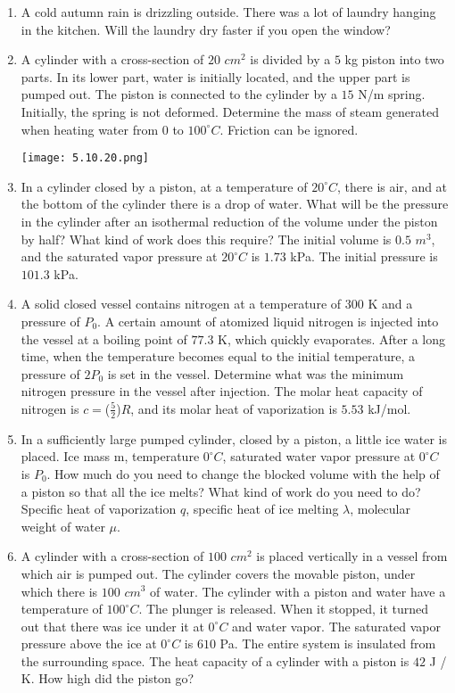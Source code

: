 \documentclass{article}
\begin{document}
\begin{enumerate}[label=5.10.\arabic*]
\item A cold autumn rain is drizzling outside. There was a lot of laundry hanging in the kitchen. Will the laundry dry faster if you open the window?

\item A cylinder with a cross-section of $20$ $cm^2$ is divided by a $5$ kg piston into two parts. In its lower part, water is initially located, and the upper part is pumped out. The piston is connected to the cylinder by a $15$ N/m spring. Initially, the spring is not deformed. Determine the mass of steam generated when heating water from $0$ to $100^\circ C$. Friction can be ignored.

\begin{center}
    \texttt{[image: 5.10.20.png]}
\end{center}

\item In a cylinder closed by a piston, at a temperature of $20^\circ C$, there is air, and at the bottom of the cylinder there is a drop of water. What will be the pressure in the cylinder after an isothermal reduction of the volume under the piston by half? What kind of work does this require? The initial volume is $0.5$ $m^3$, and the saturated vapor pressure at $20^\circ C$ is $1.73$ kPa. The initial pressure is $101.3$ kPa.

\item A solid closed vessel contains nitrogen at a temperature of $300$ K and a pressure of $P_0$. A certain amount of atomized liquid nitrogen is injected into the vessel at a boiling point of $77.3$ K, which quickly evaporates. After a long time, when the temperature becomes equal to the initial temperature, a pressure of $2P_0$ is set in the vessel. Determine what was the minimum nitrogen pressure in the vessel after injection. The molar heat capacity of nitrogen is $c = $($\frac{5}{2}$)$R$, and its molar heat of vaporization is $5.53$ kJ/mol.

\item In a sufficiently large pumped cylinder, closed by a piston, a little ice water is placed. Ice mass m, temperature $0^\circ C$, saturated water vapor pressure at $0^\circ C$ is $P_0$. How much do you need to change the blocked volume with the help of a piston so that all the ice melts? What kind of work do you need to do? Specific heat of vaporization $q$, specific heat of ice melting $\lambda$, molecular weight of water $\mu$.

\item A cylinder with a cross-section of $100$ $cm^2$ is placed vertically in a vessel from which air is pumped out. The cylinder covers the movable piston, under which there is $100$ $cm^3$ of water. The cylinder with a piston and water have a temperature of $100^\circ C$. The plunger is released. When it stopped, it turned out that there was ice under it at $0^\circ C$ and water vapor. The saturated vapor pressure above the ice at $0^\circ C$ is $610$ Pa. The entire system is insulated from the surrounding space. The heat capacity of a cylinder with a piston is $42$ J / K. How high did the piston go?


\end{enumerate}
\end{document}
